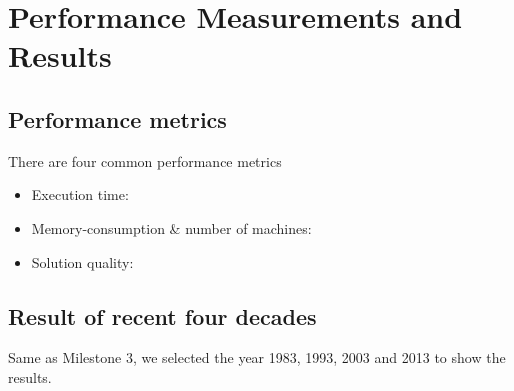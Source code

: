 \section{Performance Measurements and Results}

\subsection{Performance metrics}
There are four common performance metrics 
\begin{itemize}
    \item Execution time:
    \item Memory-consumption \& number of machines:
    \item Solution quality:
\end{itemize}

\subsection{Result of recent four decades}

Same as Milestone $3$, we selected the year 1983, 1993, 2003 and 2013 to show the results.

